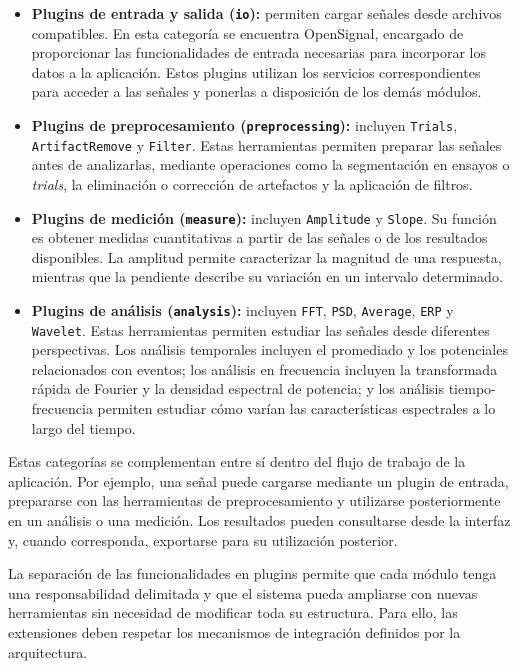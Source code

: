 \documentclass[11pt,a4paper]{article}
\DeclareRobustCommand{\_}{\textunderscore\allowbreak}
\begin{document}
\begin{itemize}
    \item \textbf{Plugins de entrada y salida (\texttt{io}):} permiten cargar señales desde archivos compatibles. En esta categoría se encuentra OpenSignal, encargado de proporcionar las funcionalidades de entrada necesarias para incorporar los datos a la aplicación. Estos plugins utilizan los servicios correspondientes para acceder a las señales y ponerlas a disposición de los demás módulos.

    \item \textbf{Plugins de preprocesamiento (\texttt{preprocessing}):} incluyen \texttt{Trials}, \texttt{ArtifactRemove} y \texttt{Filter}. Estas herramientas permiten preparar las señales antes de analizarlas, mediante operaciones como la segmentación en ensayos o \textit{trials}, la eliminación o corrección de artefactos y la aplicación de filtros.

    \item \textbf{Plugins de medición (\texttt{measure}):} incluyen \texttt{Amplitude} y \texttt{Slope}. Su función es obtener medidas cuantitativas a partir de las señales o de los resultados disponibles. La amplitud permite caracterizar la magnitud de una respuesta, mientras que la pendiente describe su variación en un intervalo determinado.

    \item \textbf{Plugins de análisis (\texttt{analysis}):} incluyen \texttt{FFT}, \texttt{PSD}, \texttt{Average}, \texttt{ERP} y \texttt{Wavelet}. Estas herramientas permiten estudiar las señales desde diferentes perspectivas. Los análisis temporales incluyen el promediado y los potenciales relacionados con eventos; los análisis en frecuencia incluyen la transformada rápida de Fourier y la densidad espectral de potencia; y los análisis tiempo-frecuencia permiten estudiar cómo varían las características espectrales a lo largo del tiempo.
\end{itemize}

Estas categorías se complementan entre sí dentro del flujo de trabajo de la aplicación. Por ejemplo, una señal puede cargarse mediante un plugin de entrada, prepararse con las herramientas de preprocesamiento y utilizarse posteriormente en un análisis o una medición. Los resultados pueden consultarse desde la interfaz y, cuando corresponda, exportarse para su utilización posterior.

La separación de las funcionalidades en plugins permite que cada módulo tenga una responsabilidad delimitada y que el sistema pueda ampliarse con nuevas herramientas sin necesidad de modificar toda su estructura. Para ello, las extensiones deben respetar los mecanismos de integración definidos por la arquitectura.
\end{document}
